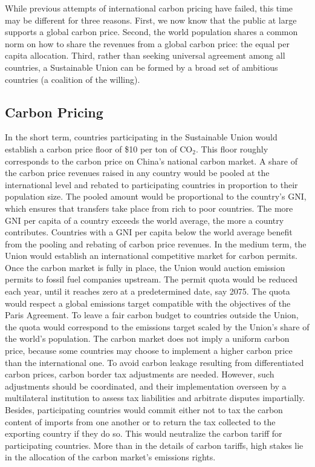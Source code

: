 \documentclass[12pt,english]{article}
\begin{document}
\begin{bibunit}
While previous attempts of international carbon pricing have failed, this time may be different for three reasons. First, we now know that the public at large supports a global carbon price. Second, the world population shares a common norm on how to share the revenues from a global carbon price: the equal per capita allocation. Third, rather than seeking universal agreement among all countries, a Sustainable Union can be formed by a broad set of ambitious countries (a coalition of the willing).

\subsection*{Carbon Pricing}
In the short term, countries participating in the Sustainable Union would establish a carbon price floor of \$10 per ton of CO$_\text{2}$. This floor roughly corresponds to the carbon price on China's national carbon market. A share of the carbon price revenues raised in any country would be pooled at the international level and rebated to participating countries in proportion to their population size. The pooled amount would be proportional to the country's GNI, which ensures that transfers take place from rich to poor countries. The more GNI per capita of a country exceeds the world average, the more a country contributes. Countries with a GNI per capita below the world average benefit from the pooling and rebating of carbon price revenues. In the medium term, the Union would establish an international competitive market for carbon permits. Once the carbon market is fully in place, the Union would auction emission permits to fossil fuel companies upstream. The permit quota would be reduced each year, until it reaches zero at a predetermined date, say 2075. The quota would respect a global emissions target compatible with the objectives of the Paris Agreement. To leave a fair carbon budget to countries outside the Union, the quota would correspond to the emissions target scaled by the Union's share of the world's population.
The carbon market does not imply a uniform carbon price, because some countries may choose to implement a higher carbon price than the international one. To avoid carbon leakage resulting from differentiated carbon prices, carbon border tax adjustments are needed. However, such adjustments should be coordinated, and their implementation overseen by a multilateral institution to assess tax liabilities and arbitrate disputes impartially. Besides, participating countries would commit either not to tax the carbon content of imports from one another or to return the tax collected to the exporting country if they do so. This would neutralize the carbon tariff for participating countries. More than in the details of carbon tariffs, high stakes lie in the allocation of the carbon market's emissions rights.


\end{bibunit}
\end{document}
